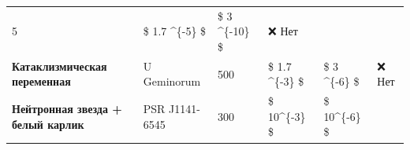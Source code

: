 \documentclass[11pt]{article}
\begin{document}
\begin{longtable}[]{@{}llllll@{}}
\begin{minipage}[t]{0.14\columnwidth}
5\strut
\end{minipage} & \begin{minipage}[t]{0.09\columnwidth}\raggedright\strut
\$ 1.7 \times 10\^{}\{-5\} \$\strut
\end{minipage} & \begin{minipage}[t]{0.21\columnwidth}\raggedright\strut
\$ 3 \times 10\^{}\{-10\} \$\strut
\end{minipage} & \begin{minipage}[t]{0.19\columnwidth}\raggedright\strut
❌ Нет\strut
\end{minipage}\tabularnewline
\begin{minipage}[t]{0.11\columnwidth}\raggedright\strut
\textbf{Катаклизмическая переменная}\strut
\end{minipage} & \begin{minipage}[t]{0.09\columnwidth}\raggedright\strut
U Geminorum\strut
\end{minipage} & \begin{minipage}[t]{0.14\columnwidth}\raggedright\strut
500\strut
\end{minipage} & \begin{minipage}[t]{0.09\columnwidth}\raggedright\strut
\$ 1.7 \times 10\^{}\{-3\} \$\strut
\end{minipage} & \begin{minipage}[t]{0.21\columnwidth}\raggedright\strut
\$ 3 \times 10\^{}\{-6\} \$\strut
\end{minipage} & \begin{minipage}[t]{0.19\columnwidth}\raggedright\strut
❌ Нет\strut
\end{minipage}\tabularnewline
\begin{minipage}[t]{0.11\columnwidth}\raggedright\strut
\textbf{Нейтронная звезда + белый карлик}\strut
\end{minipage} & \begin{minipage}[t]{0.09\columnwidth}\raggedright\strut
PSR J1141-6545\strut
\end{minipage} & \begin{minipage}[t]{0.14\columnwidth}\raggedright\strut
300\strut
\end{minipage} & \begin{minipage}[t]{0.09\columnwidth}\raggedright\strut
\$ 10\^{}\{-3\} \$\strut
\end{minipage} & \begin{minipage}[t]{0.21\columnwidth}\raggedright\strut
\$ 10\^{}\{-6\} \$\strut
\end{minipage} & \begin{minipage}[t]{0.19\columnwidth}\raggedright\strut

\end{minipage}
\end{longtable}
\end{document}
